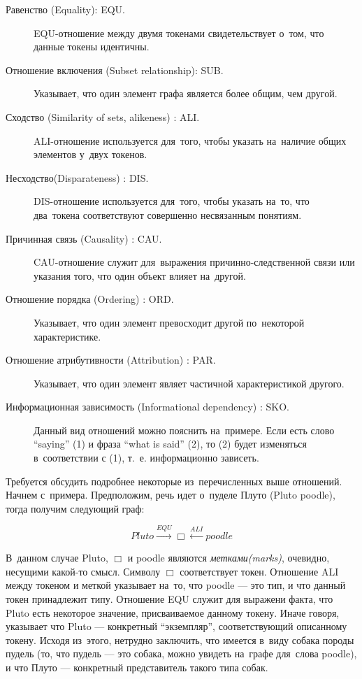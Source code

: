 \begin{description}

\item[Равенство (Equality): EQU.]
EQU-отношение между двумя токенами свидетельствует о~том, 
что данные токены идентичны.

\item [Отношение включения (Subset relationship): SUB.]
Указывает, что один элемент графа является более общим, чем другой.

\item[Сходство (Similarity of sets, alikeness) : ALI.]
ALI-отношение используется для~того, 
чтобы указать на~наличие общих элементов у~двух токенов.

\item[Несходство(Disparateness) : DIS.]
DIS-отношение используется для~того, чтобы указать на~то, 
что два~токена соответствуют совершенно несвязанным понятиям.

\item[Причинная связь (Causality) : CAU.]
CAU-отношение служит для~выражения причинно-следственной связи или
указания того, что один объект влияет на~другой. 

\item[Отношение порядка (Ordering) : ORD.]
Указывает, что один элемент превосходит другой по~некоторой характеристике.

\item[Отношение атрибутивности (Attribution) : PAR.]

Указывает, что один элемент являет частичной характеристикой другого.

\item[Информационная зависимость (Informational dependency) : SKO.]
Данный вид отношений можно пояснить на~примере. 
Если есть слово ``saying'' (1) и фраза ``what is said'' (2), 
то (2) будет изменяться в~соответствии с (1), т.~е. 
информационно зависеть.

\end{description}

Требуется обсудить подробнее некоторые из~перечисленных выше отношений. 
Начнем с~примера. 
Предположим, речь идет о~пуделе Плуто (Pluto poodle),
 тогда получим следующий граф:

$$Pluto \xrightarrow{EQU} \Box \xleftarrow{ALI} poodle $$

В~данном случае Pluto, $\Box$ и poodle являются \textsl{метками(marks)}, 
очевидно, несущими какой-то смысл. 
Символу $\Box$ соответствует токен. 
Отношение ALI между токеном и меткой указывает на~то, что poodle --- это тип,
 и что данный токен принадлежит типу. 
Отношение EQU служит для выражени факта, 
что Pluto есть некоторое значение, присваиваемое данному токену.
Иначе говоря, указывает 
что Pluto --- конкретный ``экземпляр'', соответствующий описанному токену. 
Исходя из~этого, нетрудно заключить,
что имеется в~виду собака породы пудель 
(то, что пудель --- это собака, можно увидеть на~графе для~слова  poodle), 
и что Плуто --- конкретный представитель такого типа собак.

